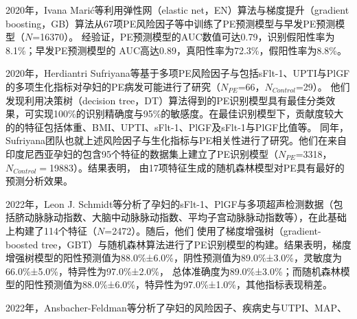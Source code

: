 2020年，Ivana Mari{\'{c}}等\cite{Maric2020}利用弹性网（elastic net，EN）算法与梯度提升（gradient boosting，GB）算法从67项PE风险因子等中训练了PE预测模型与早发PE预测模型（$N$=16370）。
经验证，PE预测模型的AUC数值可达0.79，识别假阳性率为8.1\%；早发PE预测模型的
AUC高达0.89，真阳性率为72.3\%，假阳性率为8.8\%。

2020年，Herdiantri Sufriyana等\cite{Sufriyana2020-1}基于多项PE风险因子与包括sFlt-1、UPTI与PlGF的多项生化指标对孕妇的PE病发可能进行了研究（$N_{PE}$=66，$N_{Control}$=29）。
他们发现利用决策树（decision tree，DT）算法得到的PE识别模型具有最佳分类效果，可实现100\%的识别精确度与95\%的敏感度。在最佳识别模型下，贡献度较大的的特征包括体重、BMI、UPTI、sFlt-1、PlGF及sFlt-1与PlGF比值等。
同年，Sufriyana团队也就上述风险因子与生化指标与PE相关性进行了研究\cite{Sufriyana2020}。他们在来自印度尼西亚孕妇的包含95个特征的数据集上建立了PE识别模型（$N_{PE}$=3318，$N_{Control}=$19883）。结果表明，
由17项特征生成的随机森林模型对PE具有最好的预测分析效果。


2022年，Leon J. Schmidt等\cite{SCHMIDT202277}分析了孕妇的sFlt-1、PlGF与多项超声检测数据（包括脐动脉脉动指数、大脑中动脉脉动指数、平均子宫动脉脉动指数等），在此基础上构建了114个特征（$N$=2472）。随后，他们
使用了梯度增强树（gradient-boosted tree，GBT）与随机森林算法进行了PE识别模型的构建。结果表明，梯度增强树模型的阳性预测值为88.0\%±6.0\%，阴性预测值为89.0\%±3.0\%，灵敏度为66.0\%±5.0\%，特异性为97.0\%±2.0\%，
总体准确度为89.0\%±3.0\%；而随机森林模型的阳性预测值为88.0\%±6.0\%，特异性为97.0\%±1.0\%，其他指标表现稍差。

2022年，Ansbacher-Feldman等\cite{Ansbacher2022}分析了孕妇的风险因子、疾病史与UTPI、MAP、

